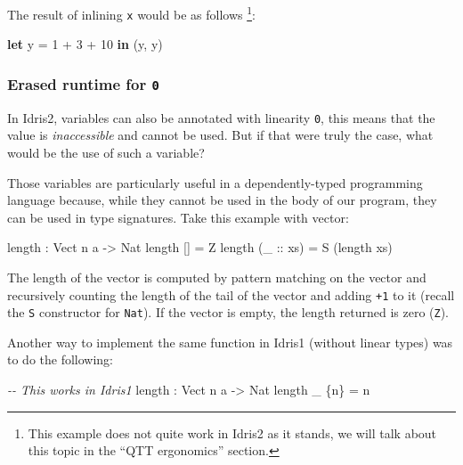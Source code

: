 \documentclass[
]{article}
\newenvironment{Shaded}{}{}
\newcommand{\CommentTok}[1]{\textcolor[rgb]{0.38,0.63,0.69}{\textit{#1}}}
\newcommand{\DataTypeTok}[1]{\textcolor[rgb]{0.56,0.13,0.00}{#1}}
\newcommand{\DecValTok}[1]{\textcolor[rgb]{0.25,0.63,0.44}{#1}}
\newcommand{\FunctionTok}[1]{\textcolor[rgb]{0.02,0.16,0.49}{#1}}
\newcommand{\KeywordTok}[1]{\textcolor[rgb]{0.00,0.44,0.13}{\textbf{#1}}}
\newcommand{\NormalTok}[1]{#1}
\newcommand{\OperatorTok}[1]{\textcolor[rgb]{0.40,0.40,0.40}{#1}}
\newcommand{\OtherTok}[1]{\textcolor[rgb]{0.00,0.44,0.13}{#1}}
\begin{document}
The result of inlining \texttt{x} would be as follows \footnote{This
  example does not quite work in Idris2 as it stands, we will talk about
  this topic in the ``QTT ergonomics'' section.}:

\begin{Shaded}
\begin{Highlighting}[]
\KeywordTok{let}\NormalTok{ y }\OtherTok{=} \DecValTok{1} \OperatorTok{+} \DecValTok{3} \OperatorTok{+} \DecValTok{10} \KeywordTok{in}
\NormalTok{    (y, y)}
\end{Highlighting}
\end{Shaded}

\hypertarget{erased-runtime-for-0}{%
\subsubsection{\texorpdfstring{Erased runtime for
\texttt{0}}{Erased runtime for 0}}\label{erased-runtime-for-0}}

In Idris2, variables can also be annotated with linearity \texttt{0},
this means that the value is \emph{inaccessible} and cannot be used. But
if that were truly the case, what would be the use of such a variable?

Those variables are particularly useful in a dependently-typed
programming language because, while they cannot be used in the body of
our program, they can be used in type signatures. Take this example with
vector:

\begin{Shaded}
\begin{Highlighting}[]
\FunctionTok{length} \OperatorTok{:} \DataTypeTok{Vect}\NormalTok{ n a }\OtherTok{{-}\textgreater{}} \DataTypeTok{Nat}
\FunctionTok{length}\NormalTok{ [] }\OtherTok{=} \DataTypeTok{Z}
\FunctionTok{length}\NormalTok{ (}\OtherTok{\_ ::}\NormalTok{ xs) }\OtherTok{=} \DataTypeTok{S}\NormalTok{ (}\FunctionTok{length}\NormalTok{ xs)}
\end{Highlighting}
\end{Shaded}

The length of the vector is computed by pattern matching on the vector
and recursively counting the length of the tail of the vector and adding
\texttt{+1} to it (recall the \texttt{S} constructor for \texttt{Nat}).
If the vector is empty, the length returned is zero (\texttt{Z}).

Another way to implement the same function in Idris1 (without linear
types) was to do the following:

\begin{Shaded}
\begin{Highlighting}[]
\CommentTok{{-}{-} This works in Idris1}
\FunctionTok{length} \OperatorTok{:} \DataTypeTok{Vect}\NormalTok{ n a }\OtherTok{{-}\textgreater{}} \DataTypeTok{Nat}
\FunctionTok{length}\NormalTok{ \_ \{n\} }\OtherTok{=}\NormalTok{ n}
\end{Highlighting}
\end{Shaded}
\end{document}
